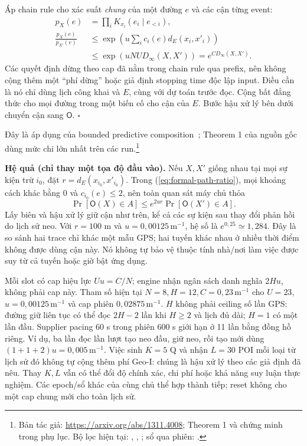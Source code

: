 \noindent
Áp chain rule cho xác suất \emph{chung} của một đường $e$ và các cận từng
event:
\begin{equation}
 \begin{split}
 p_X(e)&=\prod_i K_{x_i}(e_i\mid e_{<i}),\\
 \frac{p_X(e)}{p_{X'}(e)}
 &\leq \exp\!\left(u\sum_i c_i(e)d_E(x_i,x'_i)\right)\\
 &\leq \exp\!\left(uNU D_\infty(X,X')\right)
 =e^{C D_\infty(X,X')}.
 \end{split}
 \label{eq:formal-path-ratio}
\end{equation}
Các quyết định dừng theo cap đã nằm trong chain rule qua prefix, nên
không cộng thêm một ``phí dừng'' hoặc giả định stopping time độc lập input.
Điều cần là nó chỉ dùng lịch công khai và $E$, cùng với dự toán trước đọc.
Cộng bất đẳng thức cho mọi đường trong một biến cố cho cận của $E$. Bước
hậu xử lý bên dưới chuyển cận sang $\mathsf O$. \hfill$\square$

Đây là áp dụng của bounded predictive composition~\cite{chatzikokolakis2014predictive};
Theorem 1 của nguồn gốc dùng mức chi lớn nhất trên các run.\footnote{Bản tác
giả: \url{https://arxiv.org/abs/1311.4008}; Theorem 1 và chứng minh trong phụ
lục. Bộ lọc hiện tại: ,
,
; sổ qua phiên:
.}

\noindent\textbf{Hệ quả (chỉ thay một tọa độ đầu vào).} Nếu $X,X'$ giống nhau tại mọi sự kiện trừ $i_0$, đặt $r=d_E(x_{i_0},x'_{i_0})$. Trong (\ref{eq:formal-path-ratio}), mọi khoảng cách khác bằng 0 và $c_{i_0}(e)\leq2$, nên toàn quan sát máy chủ thỏa
\begin{equation}
 \Pr[\mathsf O(X)\in A]\leq e^{2ur}\Pr[\mathsf O(X')\in A].
 \label{eq:formal-single-coordinate}
\end{equation}
Lấy biên và hậu xử lý giữ cận như trên, kể cả các sự kiện sau thay đổi phản hồi do lịch sử neo. Với $r=100$ m và $u=0{,}00125\,\mathrm m^{-1}$, hệ số là $e^{0{,}25}\simeq1{,}284$. Đây là so sánh hai trace chỉ khác một mẫu GPS; hai tuyến khác nhau ở nhiều thời điểm không được dùng cận này. Nó không tự bảo vệ thuộc tính nhà/nơi làm việc được suy từ cả tuyến hoặc giờ bật ứng dụng.

Mỗi slot có cap hiệu lực $Uu=C/N$; engine nhận ngân sách danh nghĩa $2Hu$,
không phải cap này. Tham số hiện tại $N=8,H=12,C=0{,}23\,\mathrm m^{-1}$
cho $U=23$, $u=0{,}00125\,\mathrm m^{-1}$ và cap phiên
$0{,}02875\,\mathrm m^{-1}$. $H$ không phải ceiling số lần GPS: đường giữ
liên tục có thể đọc $2H-2$ lần khi $H\geq2$ và lịch đủ dài; $H=1$ có một
lần đầu. Supplier pacing 60 s trong phiên 600 s giới hạn ở 11 lần bằng
đồng hồ riêng. Ví dụ, ba lần đọc lần lượt tạo neo đầu, giữ neo, rồi tạo mới dùng $(1+1+2)u=0{,}005\,\mathrm m^{-1}$. Việc sinh $K=5$ Q và nhận $L=30$ POI mỗi loại từ lịch sử đó không tự cộng thêm phí Geo-I: chúng là hậu xử lý theo các giả định đã nêu. Thay $K,L$ vẫn có thể đổi độ chính xác, chi phí hoặc khả năng suy luận thực nghiệm. Các epoch/sổ khác của cùng chủ thể hợp thành tiếp; reset
không cho một cap chung mới cho toàn lịch sử.

